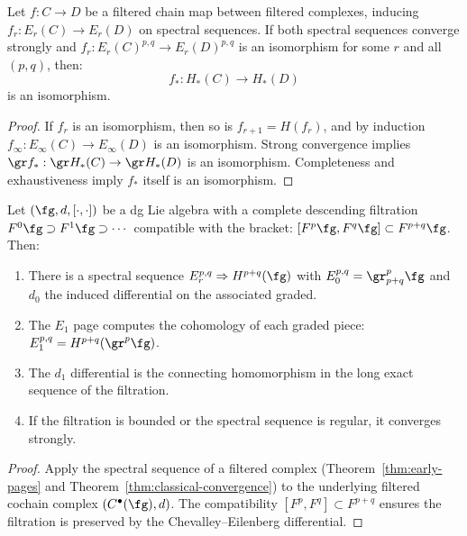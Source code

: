 \begin{theorem}
\label{thm:zeeman}
Let $f: C \to D$ be a filtered chain map between filtered complexes, inducing
$f_r: E_r(C) \to E_r(D)$ on spectral sequences. If both spectral sequences
converge strongly and $f_r: E_r(C)^{p,q} \to E_r(D)^{p,q}$ is an isomorphism
for some $r$ and all $(p, q)$, then:
\[
f_*: H_*(C) \to H_*(D)
\]
is an isomorphism.
\end{theorem}

\begin{proof}
If $f_r$ is an isomorphism, then so is $f_{r+1} = H(f_r)$, and by induction
$f_\infty: E_\infty(C) \to E_\infty(D)$ is an isomorphism. Strong convergence
implies $\gr f_*: \gr H_*(C) \to \gr H_*(D)$ is an isomorphism. Completeness
and exhaustiveness imply $f_*$ itself is an isomorphism.
\end{proof}

\begin{theorem}
\label{thm:spectral-sequence-filtered-dg}
Let $(\fg, d, [\cdot,\cdot])$ be a dg Lie algebra with a
complete descending filtration $F^0\fg \supset F^1\fg \supset \cdots$
compatible with the bracket:
$[F^p\fg, F^q\fg] \subset F^{p+q}\fg$. Then:
\begin{enumerate}[label=\textup{(\roman*)}]
\item There is a spectral sequence $E_r^{p,q} \Rightarrow H^{p+q}(\fg)$
 with $E_0^{p,q} = \gr^p_{p+q}\fg$ and $d_0$ the induced differential on
 the associated graded.
\item The $E_1$ page computes the cohomology of each graded piece:
 $E_1^{p,q} = H^{p+q}(\gr^p\fg)$.
\item The $d_1$ differential is the connecting homomorphism
 in the long exact sequence of the filtration.
\item If the filtration is bounded or the spectral sequence is
 regular, it converges strongly.
\end{enumerate}
\end{theorem}

\begin{proof}
Apply the spectral sequence of a filtered complex
(Theorem~\ref{thm:early-pages} and
Theorem~\ref{thm:classical-convergence}) to the underlying
filtered cochain complex $(C^\bullet(\fg), d)$.
The compatibility $[F^p, F^q] \subset F^{p+q}$ ensures the
filtration is preserved by the Chevalley--Eilenberg
differential.
\end{proof}

